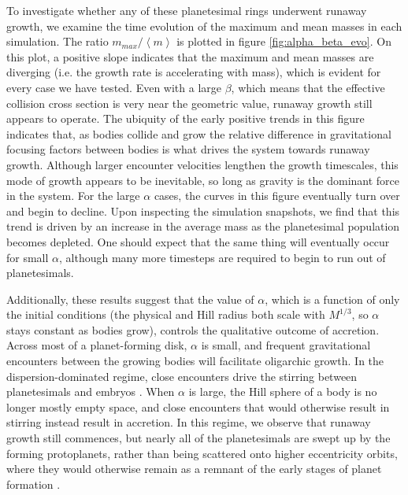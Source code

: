\documentclass[twocolumn]{aastex63}
\begin{document}
To investigate whether any of these planetesimal rings underwent
runaway growth, we examine the time evolution of the maximum and mean
masses in each simulation. The ratio $m_{max}/\left< m \right>$ is plotted
in figure \ref{fig:alpha_beta_evo}. On this plot, a positive slope
indicates that the maximum and mean masses are diverging (i.e.
the growth rate is accelerating with mass), which is
evident for every case we have tested. Even with a large
$\beta$, which means that the effective collision cross section is
very near the geometric value, runaway growth still appears to
operate. The ubiquity of the early positive trends in this figure indicates
that, as bodies collide and grow the
relative difference in gravitational focusing factors between bodies
is what drives the system towards runaway
growth. Although larger encounter velocities lengthen the growth
timescales, this mode of growth appears to be inevitable, so long as
gravity is the dominant force in the system. For the large $\alpha$
cases, the curves in this figure eventually turn over and begin to decline.
Upon inspecting the simulation snapshots, we find that this trend is
driven by an increase in the average mass as the planetesimal population
becomes depleted. One should expect that the same thing will eventually
occur for small $\alpha$, although many more timesteps are required to
begin to run out of planetesimals.

Additionally, these results suggest that the value of $\alpha$, which is a function of only the initial conditions (the physical and Hill radius both scale with $M^{1/3}$, so $\alpha$ stays constant as bodies grow), controls the qualitative outcome of accretion. Across most of a planet-forming disk, $\alpha$ is small, and frequent gravitational encounters between the growing bodies will facilitate oligarchic growth. In the dispersion-dominated regime, close encounters drive the stirring between planetesimals and embryos \citep{weidenschilling89, ida90}. When $\alpha$ is large, the Hill sphere of a body is no longer mostly empty space, and close encounters that would otherwise result in stirring instead result in accretion. In this regime, we observe that runaway growth still commences, but nearly all of the planetesimals are swept up by the forming protoplanets, rather than being scattered onto higher eccentricity orbits, where they would otherwise remain as a remnant of the early stages of planet formation \citep{kokubo98, kokubo00}.

\end{document}
